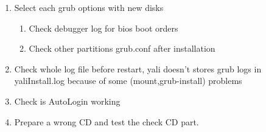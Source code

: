 \documentclass[a4paper,10pt]{article}
\begin{document}
\begin{enumerate}
\item Select each grub options with new disks
    \begin{enumerate}
        \item Check debugger log for bios boot orders
        \item Check other partitions grub.conf after installation
    \end{enumerate}

\item Check whole log file before restart, yali doesn't stores grub logs in yaliInstall.log because of some (mount,grub-install) problems
\item Check is AutoLogin working
\item Prepare a wrong CD and test the check CD part.

\end{enumerate}
\end{document}

